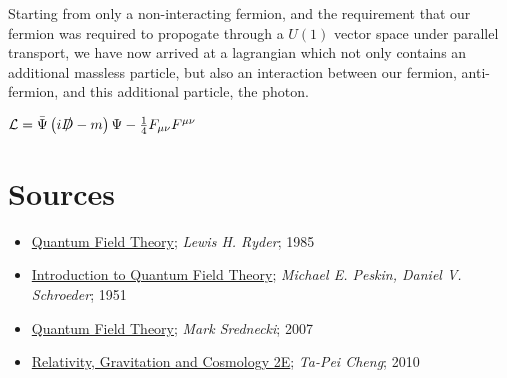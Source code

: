 \documentclass{article}
\begin{document}
        Starting from only a non-interacting fermion, and the requirement that our fermion was required to propogate through a $U(1)$ vector space under parallel transport, we have now arrived at a lagrangian which not only contains an additional massless particle, but also an interaction between our fermion, anti-fermion, and this additional particle, the photon.

        $ \mathcal{L} =  \bar{\Psi} \left( i \slashed D - m \right) \Psi - \frac{1}{4}F_{\mu \nu} F^{\mu \nu}  $



        \clearpage
        \section{Sources}
                \begin{itemize}
                        \item \underline{Quantum Field Theory}; \textit{Lewis H. Ryder}; 1985
                        \item \underline{Introduction to Quantum Field Theory}; \textit{Michael E. Peskin, Daniel V. Schroeder}; 1951
                        \item \underline{Quantum Field Theory}; \textit{Mark Srednecki}; 2007
                        \item \underline{Relativity, Gravitation and Cosmology 2E}; \textit{Ta-Pei Cheng}; 2010
                \end{itemize}
\end{document}
